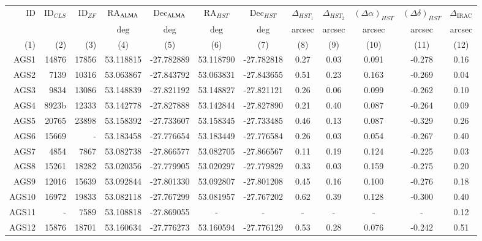 \documentclass[longauth]{aa}
\begin{document}
\begin{table*}\footnotesize     
\centering          
\begin{tabular}{r r r c c c c c c c c c}     
\hline    
ID&ID$_{CLS}$&ID$_{ZF}$&RA$_{\rm ALMA}$ &Dec$_{\rm ALMA}$ &RA$_{HST}$ &Dec$_{HST}$ & $\Delta _{HST_1} $ &$\Delta _{HST_2} $  &$(\Delta\alpha)_{HST}$ &$(\Delta\delta)_{HST}$ & $\Delta_\text{IRAC}$\\
&& &$\deg$  &$\deg$&$\deg$ &$\deg$ &arcsec&arcsec&arcsec&arcsec&arcsec\\
(1)&(2)&(3)&(4)&(5)&(6)&(7)&(8)&(9)&(10)&(11)&(12)\\
\hline    
\hline                  
 AGS1  	&  14876  	&  17856 	&  53.118815 & -27.782889 &  53.118790 & -27.782818 &    0.27 &    0.03 &    0.091 &   -0.278 & 0.16 \\
 AGS2  	&   7139  	&  10316 	&  53.063867 & -27.843792 &  53.063831 & -27.843655 &    0.51 &    0.23 &    0.163 &   -0.269 & 0.04\\
 AGS3  	&   9834  	&  13086  	&  53.148839 & -27.821192 &  53.148827 & -27.821121 &    0.26 &    0.06 &    0.099 &   -0.262 & 0.10\\
 AGS4 	&   8923b  &  12333 	&  53.142778 & -27.827888 &  53.142844 & -27.827890 &    0.21 &    0.40 &    0.087 &   -0.264 & 0.09\\
 AGS5 	&  20765  	&  23898  &  53.158392 & -27.733607 &  53.158345 & -27.733485 &    0.46 &    0.13 &    0.087 &   -0.329 & 0.26\\
 AGS6 	&  15669  	&  -   	&  53.183458 & -27.776654 &  53.183449 & -27.776584 &    0.26 &    0.03 &    0.054 &   -0.267 & 0.40\\
 AGS7 	&   4854  	&   7867	&  53.082738 & -27.866577 &  53.082705 & -27.866567 &    0.11 &    0.19 &    0.124 &   -0.225 & 0.03\\
 AGS8 	&  15261  &  18282 	&  53.020356 & -27.779905 &  53.020297 & -27.779829 &    0.33 &    0.03 &    0.159 &   -0.275 & 0.20\\
 AGS9  	&  12016  &  15639	&  53.092844 & -27.801330 &  53.092807 & -27.801208 &    0.45 &    0.16 &    0.100 &   -0.276 & 0.18\\
AGS10 	&  16972  &  19833 	&  53.082118 & -27.767299 &  53.081957 & -27.767202 &    0.62 &    0.39 &    0.128 &   -0.300 & 0.40\\
AGS11 	&      -  	&   7589 	&  53.108818 & -27.869055 &     -      	&     -      	      &    -      &    -      &     -         &     -      & 0.12\\
AGS12 	&  15876  &  18701	&  53.160634 & -27.776273 &  53.160594 & -27.776129 &    0.53 &    0.28 &    0.076 &   -0.242 & 0.51\\

\end{tabular}
\end{table*}
\end{document}
